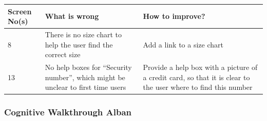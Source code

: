 \begin{table}[htdp]
\begin{center}
\begin{tabular}{|p{2cm}|p{6.5cm}|p{6.5cm}|}
\hline
\textbf{Screen No(s)} & \textbf{What is wrong} & \textbf{How to improve?} \\
\hline
8 & There is no size chart to help the user find the correct size & Add a link to a size chart \\
\hline
13 & No help boxes for ``Security number'', which might be unclear to first time users & Provide a help box with a picture of a credit card, so that it is clear to the user where to find this number \\
\hline
\end{tabular}
\end{center}
\label{10_heurisitcs_eval}
\end{table}

\subsubsection{Cognitive Walkthrough Alban}

